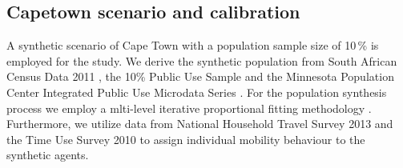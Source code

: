 \documentclass[a4paper]{article}
\begin{document}
\begin{table}[!h]
\centering
{}
\caption{Utility values for DRT scenario with double public transport prices}
\label{Utility values}
\end{table}



\subsection*{Capetown scenario and calibration}

A synthetic scenario of Cape Town with a population sample size of 10\,\% is employed for the study. We derive the synthetic population from South African Census Data 2011 \citep{census2011}, the 10\% Public Use Sample \citep{census2011public10pct} and the Minnesota Population Center Integrated Public Use Microdata Series \citep{mpc2020}. For the population synthesis process we employ a mlti-level iterative proportional fitting methodology \citep{joubert2014mipf}. Furthermore, we utilize data from National Household Travel Survey 2013 \citep{nhts2013} and the Time Use Survey 2010 \citep{tus2013} to assign individual mobility behaviour to the synthetic agents. 
\end{document}
